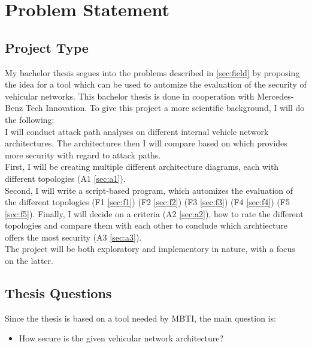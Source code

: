 
\chapter{Problem Statement}
\label{sec:problem}

\section{Project Type}\label{sec:type}

My bachelor thesis segues into the problems described in \ref{sec:field} by proposing the idea for a tool which can be used to automize the evaluation of the security of vehicular networks.
This bachelor thesis is done in cooperation with Mercedes-Benz Tech Innovation.
To give this project a more scientific background, I will do the following: \\

I will conduct attack path analyses on different internal vehicle network architectures.
The architectures then I will compare based on which provides more security with regard to attack paths.\\

First, I will be creating multiple different architecture diagrams, each with different topologies (A1 \ref{sec:a1}).\\
Second, I will write a script-based program, which automizes the evaluation of the different topologies 
(F1 \ref{sec:f1})
(F2 \ref{sec:f2})
(F3 \ref{sec:f3})
(F4 \ref{sec:f4})
(F5 \ref{sec:f5}).
Finally, I will decide on a criteria (A2 \ref{sec:a2}), how to rate the different topologies and compare them with each other
to conclude which archtiecture offers the most security (A3 \ref{sec:a3}).\\

The project will be both exploratory and implementory in nature, with a focus on the latter.


\section{Thesis Questions}\label{sec:thesis-questions}

Since the thesis is based on a tool needed by MBTI, the main question is:\\

\begin{itemize}
    \item How secure is the given vehicular network architecture?
\end{itemize}

